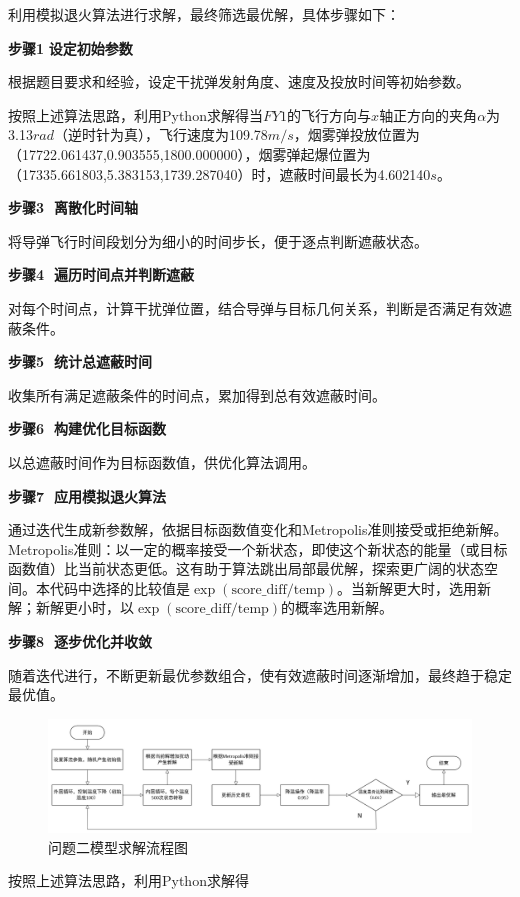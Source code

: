 \documentclass[../main.tex]{subfiles}
\begin{document}

利用模拟退火算法进行求解，最终筛选最优解，具体步骤如下：

\textbf{步骤1$\,\,$设定初始参数}

根据题目要求和经验，设定干扰弹发射角度、速度及投放时间等初始参数。

按照上述算法思路，利用Python求解得当$FY1$的飞行方向与$x$轴正方向的夹角$\alpha$为3.13$rad$（逆时针为真），飞行速度为109.78$m/s$，烟雾弹投放位置为（17722.061437,0.903555,1800.000000），烟雾弹起爆位置为（17335.661803,5.383153,1739.287040）时，遮蔽时间最长为4.602140$s$。

\textbf{步骤3 $\,\,$离散化时间轴}

将导弹飞行时间段划分为细小的时间步长，便于逐点判断遮蔽状态。

\textbf{步骤4 $\,\,$遍历时间点并判断遮蔽}

对每个时间点，计算干扰弹位置，结合导弹与目标几何关系，判断是否满足有效遮蔽条件。

\textbf{步骤5 $\,\,$统计总遮蔽时间}

收集所有满足遮蔽条件的时间点，累加得到总有效遮蔽时间。

\textbf{步骤6 $\,\,$构建优化目标函数}

以总遮蔽时间作为目标函数值，供优化算法调用。

 \textbf{步骤7 $\,\,$应用模拟退火算法}
 
 通过迭代生成新参数解，依据目标函数值变化和Metropolis准则接受或拒绝新解。\\
    Metropolis准则：以一定的概率接受一个新状态，即使这个新状态的能量（或目标函数值）比当前状态更低。这有助于算法跳出局部最优解，探索更广阔的状态空间。本代码中选择的比较值是\(\exp(\text{score\_diff} / \text{temp})\)。当新解更大时，选用新解；新解更小时，以\(\exp(\text{score\_diff} / \text{temp})\)的概率选用新解。

\textbf{步骤8 $\,\,$逐步优化并收敛}

随着迭代进行，不断更新最优参数组合，使有效遮蔽时间逐渐增加，最终趋于稳定最优值。
\begin{figure}[H]
\centering
\includegraphics[scale=0.35]{问题二模型求解流程图.png}
\caption{问题二模型求解流程图}
\label{图2}
\end{figure}

按照上述算法思路，利用Python求解得
\end{document}
